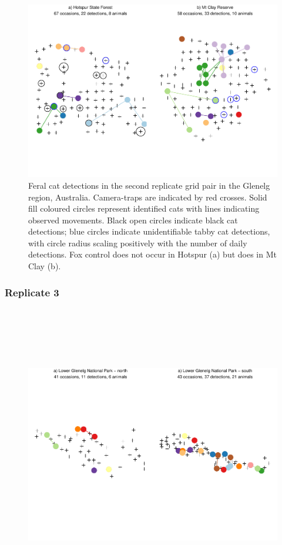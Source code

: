 \documentclass[11pt,a4paper,titlepage,twoside,openright]{style/unimelbthesis}
\begin{document}
\begin{mainmatter}
\(~\)

\(~\)

\(~\)
\begin{figure}

{\centering \includegraphics[width=1\linewidth]{figure/density-plot-ch-2-1} 

}

\caption{Feral cat detections in the second replicate grid pair in the Glenelg region, Australia. Camera-traps are indicated by red crosses. Solid fill coloured circles represent identified cats with lines indicating observed movements. Black open circles indicate black cat detections; blue circles indicate unidentifiable tabby cat detections, with circle radius scaling positively with the number of daily detections. Fox control does not occur in Hotspur (a) but does in Mt Clay (b).}\label{fig:density-plot-ch-2}
\end{figure}
\newpage

\hypertarget{replicate-3}{%
\subsubsection{Replicate 3}\label{replicate-3}}

\(~\)

\(~\)

\(~\)
\begin{figure}

{\centering \includegraphics[width=1\linewidth]{figure/density-plot-ch-3-1} 

}
\end{figure}
\end{mainmatter}
\end{document}
